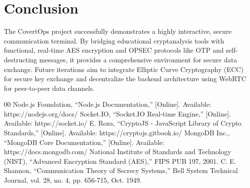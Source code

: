 \documentclass[conference]{IEEEtran}
\begin{document}
\section{Conclusion}
The CovertOps project successfully demonstrates a highly interactive, secure communication terminal. By bridging educational cryptanalysis tools with functional, real-time AES encryption and OPSEC protocols like OTP and self-destructing messages, it provides a comprehensive environment for secure data exchange. Future iterations aim to integrate Elliptic Curve Cryptography (ECC) for secure key exchange and decentralize the backend architecture using WebRTC for peer-to-peer data channels.

\begin{thebibliography}{00}
 Node.js Foundation, ``Node.js Documentation,'' [Online]. Available: https://nodejs.org/docs/
 Socket.IO, ``Socket.IO Real-time Engine,'' [Online]. Available: https://socket.io/
 E. Roza, ``CryptoJS - JavaScript Library of Crypto Standards,'' [Online]. Available: https://cryptojs.gitbook.io/
 MongoDB Inc., ``MongoDB Core Documentation,'' [Online]. Available: https://docs.mongodb.com/
 National Institute of Standards and Technology (NIST), ``Advanced Encryption Standard (AES),'' FIPS PUB 197, 2001.
 C. E. Shannon, ``Communication Theory of Secrecy Systems,'' Bell System Technical Journal, vol. 28, no. 4, pp. 656-715, Oct. 1949.
\end{thebibliography}
\end{document}
